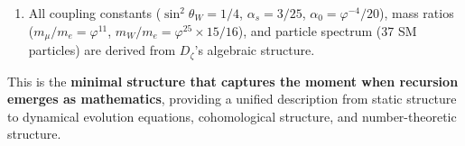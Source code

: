 \begin{enumerate}
\item All coupling constants ($\sin^2\theta_W = 1/4$, $\alpha_s = 3/25$, $\alpha_0 = \varphi^{-4}/20$), mass ratios ($m_\mu/m_e = \varphi^{11}$, $m_W/m_e = \varphi^{25} \times 15/16$), and particle spectrum (37 SM particles) are derived from $D_\zeta$'s algebraic structure.
\end{enumerate}

This is the \textbf{minimal structure that captures the moment when recursion emerges as mathematics}, providing a unified description from static structure to dynamical evolution equations, cohomological structure, and number-theoretic structure.
